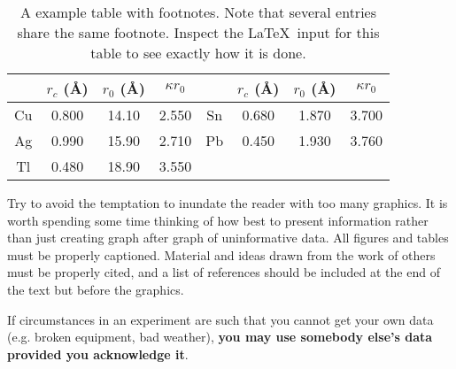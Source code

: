 \documentclass[aps,twocolumn,secnumarabic,nobalancelastpage,amsmath,amssymb,nofootinbib]{revtex4}
\begin{document}
\begin{table}[h]
\caption{\label{tab:table1}A example table with footnotes.  Note that several 
entries share the same
footnote. Inspect the \LaTeX\ input for this table to see
exactly how it is done.}
\begin{ruledtabular}
\begin{tabular}{cccccccc}
 &$r_c$ (\AA)&$r_0$ (\AA)&$\kappa r_0$&
 &$r_c$ (\AA) &$r_0$ (\AA)&$\kappa r_0$\\
\hline
Cu& 0.800 & 14.10 & 2.550 &Sn\footnotemark[1] & 0.680 & 1.870 & 3.700 \\
Ag& 0.990 & 15.90 & 2.710 &Pb\footnotemark[1] & 0.450 & 1.930 & 3.760 \\
Tl& 0.480 & 18.90 & 3.550 & & & & \\
\end{tabular}
\end{ruledtabular}
\end{table}

Try to avoid the temptation to inundate the reader with too many
graphics.  It is worth spending some time thinking of how best to
present information rather than just creating graph after graph of
uninformative data.  All figures and tables must be properly
captioned.  Material and ideas drawn from the work of others must be
properly cited, and a list of references should be included at the end
of the text but before the graphics.



\begin{figure*}[htb]
\caption{Sample paneled figure created in Matlab using the
subplot(2,2,x) command where x is the element of the plot array into
which all subsequent commands such as plot(x,y) and xlabel('Volts'),
etc. get processed.  Use the caption space to provide more details
about the data, their acquisition or how they were processed if you do
not have sufficient room in the main body of text.  Figures can be
rotated using the angle command, see the TeX file for details.  If a
figure is to be placed after the main text use the ``figure*'' option
to make it extend over two columns, see the \LaTeX file for how this
was done.}
\label{fig:panel2x2}
\end{figure*}


If circumstances in an experiment are such that you cannot get your
own data (e.g. broken equipment, bad weather), {\bf you may use
somebody else's data provided you acknowledge it}.
\end{document}
